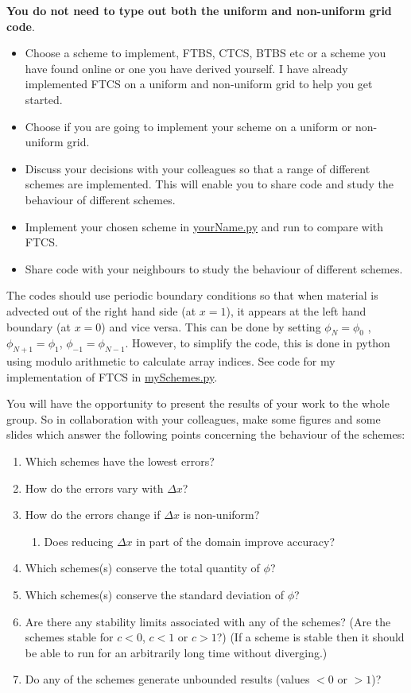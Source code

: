\textbf{You do not need to type out both the uniform and non-uniform
grid code}. 
\begin{itemize}
\item Choose a scheme to implement, FTBS, CTCS, BTBS etc or a scheme you
have found online or one you have derived yourself. I have already
implemented FTCS on a uniform and non-uniform grid to help you get
started.
\item Choose if you are going to implement your scheme on a uniform or non-uniform
grid. 
\item Discuss your decisions with your colleagues so that a range of different
schemes are implemented. This will enable you to share code and study
the behaviour of different schemes. 
\item Implement your chosen scheme in \url{yourName.py} and run to compare
with FTCS. 
\item Share code with your neighbours to study the behaviour of different
schemes. 
\end{itemize}
The codes should use periodic boundary conditions so that when material
is advected out of the right hand side (at $x=1$), it appears at
the left hand boundary (at $x=0$) and vice versa. This can be done
by setting $\phi_{N}=\phi_{0}$ , $\phi_{N+1}=\phi_{1}$, $\phi_{-1}=\phi_{N-1}$.
However, to simplify the code, this is done in python using modulo
arithmetic to calculate array indices. See code for my implementation
of FTCS in \url{mySchemes.py}.

You will have the opportunity to present the results of your work
to the whole group. So in collaboration with your colleagues, make
some figures and some slides which answer the following points concerning
the behaviour of the schemes:
\begin{enumerate}
\item Which schemes have the lowest errors?
\item How do the errors vary with $\Delta x$?
\item How do the errors change if $\Delta x$ is non-uniform?

\begin{enumerate}
\item Does reducing $\Delta x$ in part of the domain improve accuracy?
\end{enumerate}
\item Which schemes(s) conserve the total quantity of $\phi$?
\item Which schemes(s) conserve the standard deviation of $\phi$?
\item Are there any stability limits associated with any of the schemes?
(Are the schemes stable for $c<0$, $c<1$ or $c>1$?) (If a scheme
is stable then it should be able to run for an arbitrarily long time
without diverging.)
\item Do any of the schemes generate unbounded results (values $<0$ or
$>1$)?
\end{enumerate}

